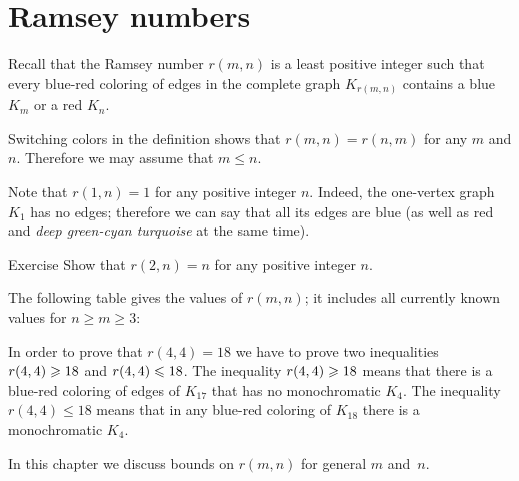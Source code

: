 \chapter{Ramsey numbers}

Recall that the Ramsey number $r(m,n)$ is a least positive integer such that every blue-red coloring of edges in the complete graph $K_{r(m, n)}$ contains a blue $K_m$ or a red $K_n$.

Switching colors in the definition shows that $r(m,n)=r(n,m)$ for any $m$ and $n$.
Therefore we may assume that $m\le n$.

Note that $r(1,n)=1$ for any positive integer $n$.
Indeed, the one-vertex graph $K_1$ has no edges;
therefore we can say that all its edges are blue (as well as red and \emph{deep green-cyan turquoise} at the same time).

\begin{thm}{Exercise}
Show that $r(2,n)=n$ for any positive integer $n$.
\end{thm}

The following table gives the values of $r(m,n)$;
it includes all currently known values for $n\ge m\ge 3$:

\begin{table}[h!]\label{ramsey-table}
%
\end{table}

In order to prove that $r(4,4)=18$ we have to prove two inequalities $r(4,4)\z\ge 18$ and $r(4,4)\z\le 18$.
The inequality $r(4,4)\z\ge 18$ means that there is a blue-red coloring of edges of $K_{17}$ that has no monochromatic $K_4$.
The inequality $r(4,4)\le 18$ means that in any blue-red coloring of $K_{18}$ there is a monochromatic $K_4$.

In this chapter we discuss bounds on $r(m,n)$ for general $m$ and~$n$. 

